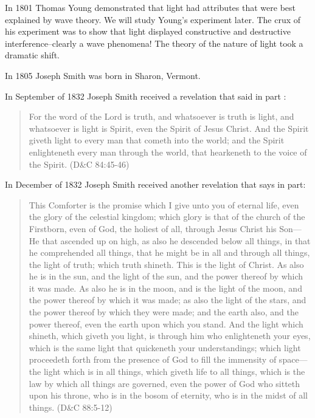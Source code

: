 \documentclass{article}
\begin{document}
In 1801 Thomas Young demonstrated that light had attributes that were best
explained by wave theory. We will study Young's experiment later. The crux
of his experiment was to show that light displayed constructive and
destructive interference--clearly a wave phenomena! The theory of the nature
of light took a dramatic shift.

In 1805 Joseph Smith was born in Sharon, Vermont.

In September of 1832 Joseph Smith received a revelation that said in part :

\begin{quotation}
For the word of the Lord is truth, and whatsoever is truth is light, and
whatsoever is light is Spirit, even the Spirit of Jesus Christ. And the
Spirit giveth light to every man that cometh into the world; and the Spirit
enlighteneth every man through the world, that hearkeneth to the voice of
the Spirit. (D\&C 84:45-46)
\end{quotation}

In December of 1832 Joseph Smith received another revelation that says in
part:

\begin{quotation}
This Comforter is the promise which I give unto you of eternal life, even
the glory of the celestial kingdom; which glory is that of the church of the
Firstborn, even of God, the holiest of all, through Jesus Christ his
Son---He that ascended up on high, as also he descended below all things, in
that he comprehended all things, that he might be in all and through all
things, the light of truth; which truth shineth. This is the light of
Christ. As also he is in the sun, and the light of the sun, and the power
thereof by which it was made. As also he is in the moon, and is the light of
the moon, and the power thereof by which it was made; as also the light of
the stars, and the power thereof by which they were made; and the earth
also, and the power thereof, even the earth upon which you stand. And the
light which shineth, which giveth you light, is through him who enlighteneth
your eyes, which is the same light that quickeneth your understandings;
which light proceedeth forth from the presence of God to fill the immensity
of space---the light which is in all things, which giveth life to all
things, which is the law by which all things are governed, even the power of
God who sitteth upon his throne, who is in the bosom of eternity, who is in
the midst of all things. (D\&C 88:5-12)
\end{quotation}
\end{document}
